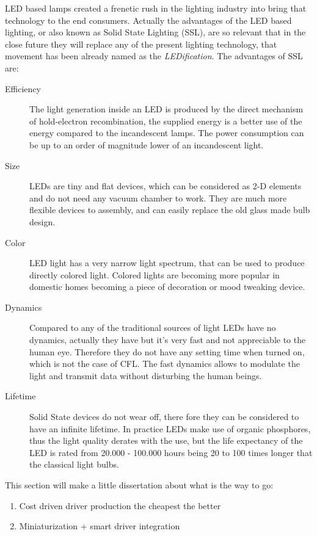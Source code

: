 LED based lamps created a frenetic rush in the lighting industry into bring that technology to the end consumers. Actually the advantages of the LED based lighting, or also known as Solid State Lighting (SSL), are so relevant that in the close future they will replace any of the present lighting technology, that movement has been already named as the \emph{LEDification}. The advantages of SSL are:
\begin{description}
  \item [Efficiency] The light generation inside an LED is produced by the direct mechanism of hold-electron recombination, the supplied energy is a better use of the energy compared to the incandescent lamps. The power consumption can be up to an order of magnitude lower of an incandescent light. 
  
  \item [Size] LEDs are tiny and flat devices, which can be considered as 2-D elements and do not need any vacuum chamber to work. They are much more flexible devices to assembly, and can easily replace the old glass made bulb design.
       
  \item [Color] LED light has a very narrow light spectrum, that can be used to produce directly colored light. Colored lights are becoming more popular in domestic homes becoming a piece of decoration or mood tweaking device.
      
  \item [Dynamics] Compared to any of the traditional sources of light LEDs have no dynamics, actually they have but it's very fast and not appreciable to the human eye. Therefore they do not have any setting time when turned on, which is not the case of CFL. The fast dynamics allows to modulate the light and transmit data without disturbing the human beings.
      
  \item [Lifetime] Solid State devices do not wear off, there fore they can be considered to have an infinite lifetime. In practice LEDs make use of organic phosphores, thus the light quality derates with the use, but the life expectancy of the LED is rated from 20.000 - 100.000 hours being 20 to 100 times longer that the classical light bulbs.  
  
\end{description}
 

This section will make a little dissertation about what is the way to go:
\begin{enumerate}
  \item Cost driven driver production the cheapest the better
  \item Miniaturization + smart driver integration
\end{enumerate}

